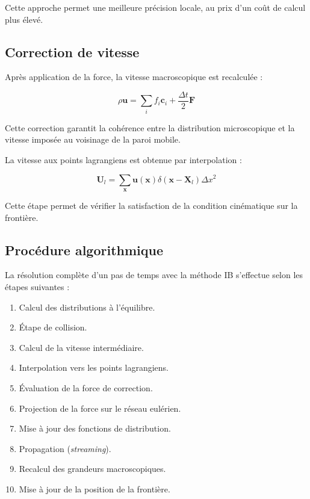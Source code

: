 \documentclass[12pt,a4paper]{report}
\begin{document}
Cette approche permet une meilleure précision locale, au prix d’un coût de calcul plus élevé.

\subsection{Correction de vitesse}

Après application de la force, la vitesse macroscopique est recalculée :

\begin{equation}
\rho \mathbf{u}
=
\sum_i f_i \mathbf{c}_i
+
\frac{\Delta t}{2}\mathbf{F}
\end{equation}

Cette correction garantit la cohérence entre la distribution microscopique et la vitesse imposée au voisinage de la paroi mobile.

La vitesse aux points lagrangiens est obtenue par interpolation :

\begin{equation}
\mathbf{U}_{l}
=
\sum_{\mathbf{x}}
\mathbf{u}(\mathbf{x})
\delta(\mathbf{x}-\mathbf{X}_{l})
\Delta x^2
\end{equation}

Cette étape permet de vérifier la satisfaction de la condition cinématique sur la frontière.

\subsection{Procédure algorithmique}

La résolution complète d’un pas de temps avec la méthode IB s’effectue selon les étapes suivantes :

\begin{enumerate}
\item Calcul des distributions à l’équilibre.
\item Étape de collision.
\item Calcul de la vitesse intermédiaire.
\item Interpolation vers les points lagrangiens.
\item Évaluation de la force de correction.
\item Projection de la force sur le réseau eulérien.
\item Mise à jour des fonctions de distribution.
\item Propagation (\textit{streaming}).
\item Recalcul des grandeurs macroscopiques.
\item Mise à jour de la position de la frontière.
\end{enumerate}
\end{document}
